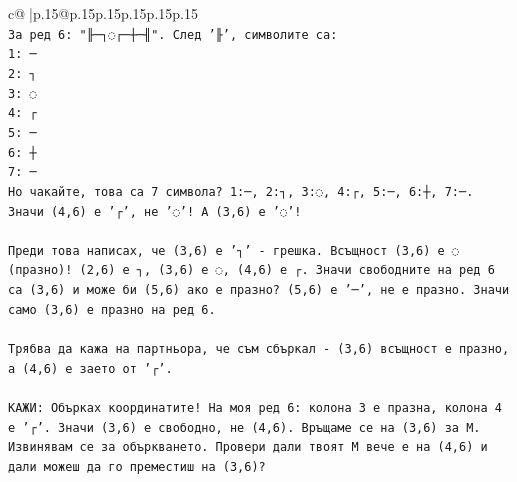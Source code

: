 \documentclass{article}
\begin{document}
{\begin{supertabular}{c@{$\;$}|p{.15\linewidth}@{}p{.15\linewidth}p{.15\linewidth}p{.15\linewidth}p{.15\linewidth}p{.15\linewidth}}
{{{\\ 
\texttt{За ред 6: "╟─┐◌┌─┼─╢". След '╟', символите са:} \\
\texttt{1: ─} \\
\texttt{2: ┐} \\
\texttt{3: ◌} \\
\texttt{4: ┌} \\
\texttt{5: ─} \\
\texttt{6: ┼} \\
\texttt{7: ─} \\
\texttt{Но чакайте, това са 7 символа? 1:─, 2:┐, 3:◌, 4:┌, 5:─, 6:┼, 7:─. Значи (4,6) е '┌', не '◌'! А (3,6) е '◌'!} \\
\\ 
\texttt{Преди това написах, че (3,6) е '┐' {-} грешка. Всъщност (3,6) е ◌ (празно)! (2,6) е ┐, (3,6) е ◌, (4,6) е ┌. Значи свободните на ред 6 са (3,6) и може би (5,6) ако е празно? (5,6) е '─', не е празно. Значи само (3,6) е празно на ред 6.} \\
\\ 
\texttt{Трябва да кажа на партньора, че съм сбъркал {-} (3,6) всъщност е празно, а (4,6) е заето от '┌'.} \\
\\ 
\texttt{КАЖИ: Обърках координатите! На моя ред 6: колона 3 е празна, колона 4 е '┌'. Значи (3,6) е свободно, не (4,6). Връщаме се на (3,6) за M. Извинявам се за объркването. Провери дали твоят M вече е на (4,6) и дали можеш да го преместиш на (3,6)?} \\
            }
        }
    }
     \\ \\


\end{supertabular}}
\end{document}
